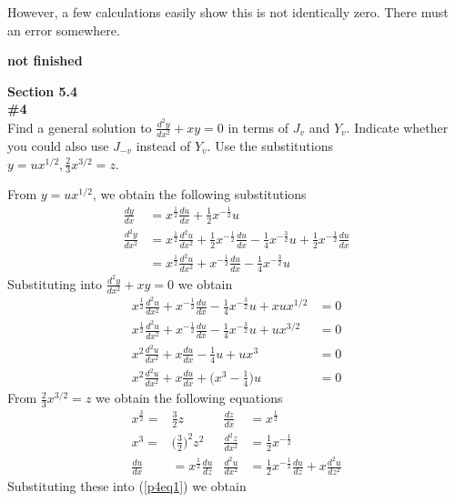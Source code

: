 \documentclass[12pt]{article}
\newcommand{\problem}[1]{\hspace{-4 ex} \large \textbf{#1}\\}
\begin{document}
	However, a few calculations easily show this is not identically zero. There must an error somewhere.
	
	\bigbreak
	\textbf{not finished}

\large{\textbf{Section 5.4}}\\
\problem{\#4} Find a general solution to $\frac{d^2y}{dx^2} + xy = 0$ in terms of $J_v$ and $Y_v$. Indicate whether you could also use $J_{-v}$ instead of $Y_v$. Use the substitutions \\$y = ux^{1/2}, \frac{2}{3}x^{3/2}=z$. \bigbreak

	From $y = ux^{1/2}$, we obtain the following substitutions
	\begin{align*}
		\frac{dy}{dx} & = x^{\frac{1}{2}}\frac{du}{dx} + \tfrac{1}{2}x^{-\frac{1}{2}}u \\
		\frac{d^2y}{dx^2} & = x^{\frac{1}{2}}\frac{d^2u}{dx^2} + \tfrac{1}{2}x^{-\frac{1}{2}}\frac{du}{dx} - \tfrac{1}{4}x^{-\frac{3}{2}}u + \tfrac{1}{2}x^{-\frac{1}{2}}\frac{du}{dx} \\
		& = x^{\frac{1}{2}}\frac{d^2u}{dx^2} + x^{-\frac{1}{2}}\frac{du}{dx} - \tfrac{1}{4}x^{-\frac{3}{2}}u
	\end{align*}
	Substituting into $\frac{d^2y}{dx^2} + xy =  0$ we obtain
	\begin{align}
		x^{\frac{1}{2}}\frac{d^2u}{dx^2} + x^{-\frac{1}{2}}\frac{du}{dx} - \tfrac{1}{4}x^{-\frac{3}{2}}u + xux^{1/2} & =  0 \nonumber \\
		x^{\frac{1}{2}}\frac{d^2u}{dx^2} + x^{-\frac{1}{2}}\frac{du}{dx} - \tfrac{1}{4}x^{-\frac{3}{2}}u + ux^{3/2} & =  0 \nonumber \\
		x^2\frac{d^2u}{dx^2} + x\frac{du}{dx} - \tfrac{1}{4}u + ux^3 & =  0 \nonumber  \\
		x^2\frac{d^2u}{dx^2} + x\frac{du}{dx} + \big(x^3 - \tfrac{1}{4}\big)u & = 0 \label{p4eq1}
	\end{align}
	From $\frac{2}{3}x^{3/2}=z$ we obtain the following equations
	\begin{align}
		x^\frac{3}{2} = & \tfrac{3}{2}z  &  \frac{dz}{dx} & = x^\frac{1}{2}   \nonumber \\
		x^3 = & \big(\tfrac{3}{2}\big)^2z^2  & \frac{d^2z}{dx^2} & = \tfrac{1}{2}x^{-\frac{1}{2}}  \nonumber \\
		\frac{du}{dx} & = x^\frac{1}{2}\frac{du}{dz}  &  \frac{d^2u}{dx^2} & = \tfrac{1}{2}x^{-\frac{1}{2}}\frac{du}{dz} + x\frac{d^2u}{dz^2} \nonumber
	\end{align}
	Substituting these into (\ref{p4eq1}) we obtain
\end{document}
